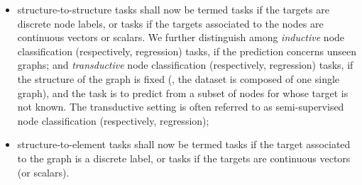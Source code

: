 \begin{itemize}
    \item structure-to-structure tasks shall now be termed  tasks if the targets are discrete node labels, or  tasks if the targets associated to the nodes are continuous vectors or scalars. We further distinguish among \emph{inductive} node classification (respectively, regression) tasks, if the prediction concerns unseen graphs; and \emph{transductive} node classification (respectively, regression) tasks, if the structure of the graph is fixed (\ie, the dataset is composed of one single graph), and the task is to predict from a subset of nodes for whose target is not known. The transductive setting is often referred to as semi-supervised node classification (respectively, regression);
    \item structure-to-element tasks shall now be termed  tasks if the target associated to the graph is a discrete label, or  tasks if the targets are continuous vectors (or scalars).
\end{itemize}

